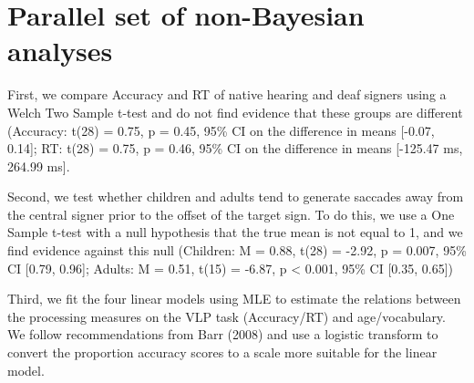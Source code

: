 \documentclass[oneside]{report}
\begin{document}
\section{Parallel set of non-Bayesian
analyses}\label{parallel-set-of-non-bayesian-analyses}

First, we compare Accuracy and RT of native hearing and deaf signers
using a Welch Two Sample t-test and do not find evidence that these
groups are different (Accuracy: t(28) = 0.75, p = 0.45, 95\% CI on the
difference in means {[}-0.07, 0.14{]}; RT: t(28) = 0.75, p = 0.46, 95\%
CI on the difference in means {[}-125.47 ms, 264.99 ms{]}.

Second, we test whether children and adults tend to generate saccades
away from the central signer prior to the offset of the target sign. To
do this, we use a One Sample t-test with a null hypothesis that the true
mean is not equal to 1, and we find evidence against this null
(Children: M = 0.88, t(28) = -2.92, p = 0.007, 95\% CI {[}0.79, 0.96{]};
Adults: M = 0.51, t(15) = -6.87, p \textless{} 0.001, 95\% CI {[}0.35,
0.65{]})

Third, we fit the four linear models using MLE to estimate the relations
between the processing measures on the VLP task (Accuracy/RT) and
age/vocabulary. We follow recommendations from Barr (2008) and use a
logistic transform to convert the proportion accuracy scores to a scale
more suitable for the linear model.
\begin{table}

\caption[Results for MLE models]{\label{tab:unnamed-chunk-12}Results for the four linear models fit using Maxiumum Likelihood Estimation. All p-values are one-sided to reflect our directional hypotheses about the VLP measures improving over development.}
\centering
{}
\end{table}
\end{document}
